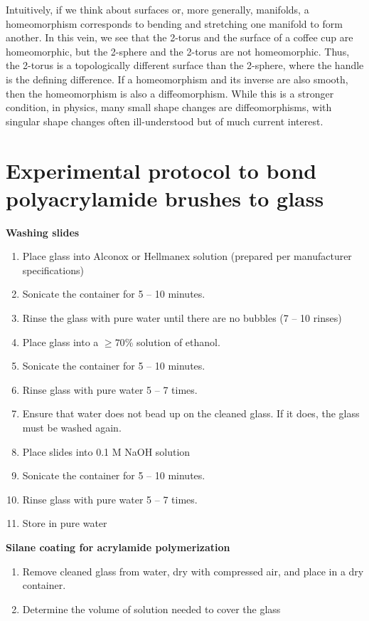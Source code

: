 \begin{appendices}
Intuitively, if we think about surfaces or, more generally, manifolds, a homeomorphism corresponds to bending and stretching one manifold to form another.
In this vein, we see that the 2-torus and the surface of a coffee cup are homeomorphic, but the 2-sphere and the 2-torus are not homeomorphic.
Thus, the 2-torus is a topologically different surface than the 2-sphere, where the handle is the defining difference.
If a homeomorphism and its inverse are also smooth, then the homeomorphism is also a diffeomorphism.
While this is a stronger condition, in physics, many small shape changes are diffeomorphisms, with singular shape changes often ill-understood but of much current interest.




\chapter{Experimental protocol to bond polyacrylamide brushes to glass}\label{a:B}
{\bf Washing slides}
\begin{enumerate}
  \item Place glass into Alconox or Hellmanex solution (prepared per manufacturer specifications)
  \item Sonicate the container for 5 -- 10 minutes.
  \item Rinse the glass with pure water until there are no bubbles (7 -- 10 rinses)
  \item Place glass into a $\geq 70$\% solution of ethanol.
  \item Sonicate the container for 5 -- 10 minutes.
  \item Rinse glass with pure water 5 -- 7 times.
  \item Ensure that water does not bead up on the cleaned glass. If it does, the glass must be washed again.
  \item Place slides into 0.1 M NaOH solution
  \item Sonicate the container for 5 -- 10 minutes.
  \item Rinse glass with pure water 5 -- 7 times.
  \item Store in pure water
\end{enumerate}
{\bf Silane coating for acrylamide polymerization}
\begin{enumerate}
  \item Remove cleaned glass from water, dry with compressed air, and place in a dry container.
  \item Determine the volume of solution needed to cover the glass

\end{enumerate}
\end{appendices}
